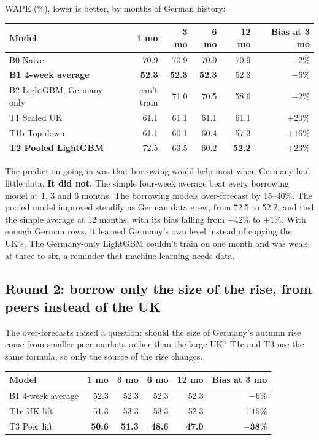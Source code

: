 \documentclass[11pt]{article}
\newcommand{\best}[1]{\textbf{#1}}
\begin{document}
WAPE (\%), lower is better, by months of German history:

\begin{center}
\begin{tabular}{l r r r r r}
\toprule
Model & 1 mo & 3 mo & 6 mo & 12 mo & Bias at 3 mo \\
\midrule
B0 Naive & 70.9 & 70.9 & 70.9 & 70.9 & $-2\%$ \\
\best{B1 4-week average} & \best{52.3} & \best{52.3} & \best{52.3} & 52.3 & $-6\%$ \\
B2 LightGBM, Germany only & can't train & 71.0 & 70.5 & 58.6 & $-2\%$ \\
T1 Scaled UK & 61.1 & 61.1 & 61.1 & 61.1 & $+20\%$ \\
T1b Top-down & 61.1 & 60.1 & 60.4 & 57.3 & $+16\%$ \\
\best{T2 Pooled LightGBM} & 72.5 & 63.5 & 60.2 & \best{52.2} & $+23\%$ \\
\bottomrule
\end{tabular}
\end{center}

The prediction going in was that borrowing would help most when Germany had little data. \textbf{It did
not.} The simple four-week average beat every borrowing model at 1, 3 and 6 months. The borrowing models
over-forecast by 15--40\%. The pooled model improved steadily as German data grew, from 72.5 to 52.2, and
tied the simple average at 12 months, with its bias falling from $+42\%$ to $+1\%$. With enough German
rows, it learned Germany's own level instead of copying the UK's. The Germany-only LightGBM couldn't
train on one month and was weak at three to six, a reminder that machine learning needs data.

\subsection*{Round 2: borrow only the size of the rise, from peers instead of the UK}

The over-forecasts raised a question: should the size of Germany's autumn rise come from smaller peer
markets rather than the large UK? T1c and T3 use the same formula, so only the source of the rise
changes.

\begin{center}
\begin{tabular}{l r r r r r}
\toprule
Model & 1 mo & 3 mo & 6 mo & 12 mo & Bias at 3 mo \\
\midrule
B1 4-week average & 52.3 & 52.3 & 52.3 & 52.3 & $-6\%$ \\
T1c UK lift & 51.3 & 53.3 & 53.3 & 52.3 & $+15\%$ \\
T3 Peer lift & \best{50.6} & \best{51.3} & \best{48.6} & \best{47.0} & $\mathbf{-38\%}$ \\
\bottomrule
\end{tabular}
\end{center}
\end{document}
